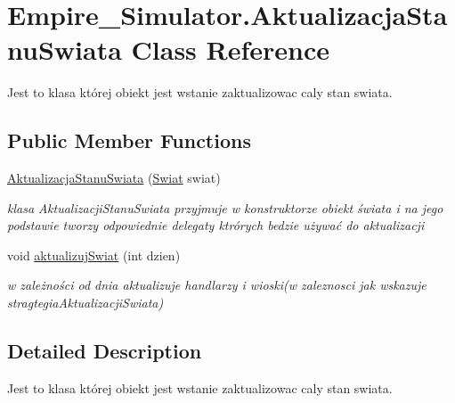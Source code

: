 \hypertarget{class_empire___simulator_1_1_aktualizacja_stanu_swiata}{\section{Empire\+\_\+\+Simulator.\+Aktualizacja\+Stanu\+Swiata Class Reference}
\label{class_empire___simulator_1_1_aktualizacja_stanu_swiata}
}


Jest to klasa której obiekt jest wstanie zaktualizowac caly stan swiata.  


\subsection*{Public Member Functions}
\begin{DoxyCompactItemize}
\item 
\hyperlink{class_empire___simulator_1_1_aktualizacja_stanu_swiata_a1bf42c8cb38ac168165548047c84d282}{Aktualizacja\+Stanu\+Swiata} (\hyperlink{class_empire___simulator_1_1_swiat}{Swiat} swiat)
\begin{DoxyCompactList}\small\item\em klasa Aktualizacji\+Stanu\+Swiata przyjmuje w konstruktorze obiekt świata i na jego podstawie tworzy odpowiednie delegaty ktrórych bedzie używać do aktualizacji \end{DoxyCompactList}\item 
void \hyperlink{class_empire___simulator_1_1_aktualizacja_stanu_swiata_a899b38be209952b925db7f7505645cd6}{aktualizuj\+Swiat} (int dzien)
\begin{DoxyCompactList}\small\item\em w zależności od dnia aktualizuje handlarzy i wioski(w zaleznosci jak wskazuje stragtegia\+Aktualizacji\+Swiata) \end{DoxyCompactList}\end{DoxyCompactItemize}


\subsection{Detailed Description}
Jest to klasa której obiekt jest wstanie zaktualizowac caly stan swiata. 



